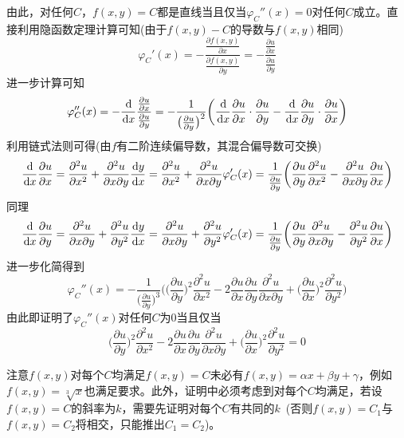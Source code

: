 \documentclass[a4paper,UTF8,fontset=windows,AutoFakeBold]{ctexart}
\newcommand*{\dr}{\hspace{0.07em}\mathrm{d}}
\newcommand*{\note}{\noindent *}
\theoremstyle{ex}
\begin{document}
\begin{enumerate}
    由此，对任何$C$，$f(x,y)=C$都是直线当且仅当$\varphi_C''(x)=0$对任何$C$成立。直接利用隐函数定理计算可知(由于$f(x,y)-C$的导数与$f(x,y)$相同)
    $$\varphi_C'(x)=-\frac{\frac{\partial f(x,y)}{\partial x}}{\frac{\partial f(x,y)}{\partial y}}=-\frac{\frac{\partial u}{\partial x}}{\frac{\partial u}{\partial y}}$$
    进一步计算可知
    $$\varphi_C''(x)=-\frac{\dr}{\dr x}\frac{\frac{\partial u}{\partial x}}{\frac{\partial u}{\partial y}}=-\frac{1}{\big(\frac{\partial u}{\partial y}\big)^2}\bigg(\frac{\dr}{\dr x}\frac{\partial u}{\partial x}\cdot\frac{\partial u}{\partial y}-\frac{\dr}{\dr x}\frac{\partial u}{\partial y}\cdot\frac{\partial u}{\partial x}\bigg)$$
    利用链式法则可得(由$f$有二阶连续偏导数，其混合偏导数可交换)
    $$\frac{\dr}{\dr x}\frac{\partial u}{\partial x}=\frac{\partial^2u}{\partial x^2}+\frac{\partial^2u}{\partial x\partial y}\frac{\dr y}{\dr x}=\frac{\partial^2u}{\partial x^2}+\frac{\partial^2u}{\partial x\partial y}\varphi_C'(x)=\frac{1}{\frac{\partial u}{\partial y}}\bigg(\frac{\partial u}{\partial y}\frac{\partial^2u}{\partial x^2}-\frac{\partial^2u}{\partial x\partial y}\frac{\partial u}{\partial x}\bigg)$$
    同理
    $$\frac{\dr}{\dr x}\frac{\partial u}{\partial y}=\frac{\partial^2u}{\partial x\partial y}+\frac{\partial^2u}{\partial y^2}\frac{\dr y}{\dr x}=\frac{\partial^2u}{\partial x\partial y}+\frac{\partial^2u}{\partial y^2}\varphi_C'(x)=\frac{1}{\frac{\partial u}{\partial y}}\bigg(\frac{\partial u}{\partial y}\frac{\partial^2u}{\partial x\partial y}-\frac{\partial^2u}{\partial y^2}\frac{\partial u}{\partial x}\bigg)$$
    进一步化简得到
    $$\varphi_C''(x)=-\frac{1}{\big(\frac{\partial u}{\partial y}\big)^3}\bigg(\bigg(\frac{\partial u}{\partial y}\bigg)^2\frac{\partial^2u}{\partial x^2}-2\frac{\partial u}{\partial x}\frac{\partial u}{\partial y}\frac{\partial^2u}{\partial x\partial y}+\bigg(\frac{\partial u}{\partial x}\bigg)^2\frac{\partial^2u}{\partial y^2}\bigg)$$
    由此即证明了$\varphi_C''(x)$对任何$C$为0当且仅当
    $$\bigg(\frac{\partial u}{\partial y}\bigg)^2\frac{\partial^2u}{\partial x^2}-2\frac{\partial u}{\partial x}\frac{\partial u}{\partial y}\frac{\partial^2u}{\partial x\partial y}+\bigg(\frac{\partial u}{\partial x}\bigg)^2\frac{\partial^2u}{\partial y^2}=0$$

    \note 注意$f(x,y)$对每个$C$均满足$f(x,y)=C$未必有$f(x,y)=\alpha x+\beta y+\gamma$，例如$f(x,y)=\sqrt[3]{x}$也满足要求。此外，证明中必须考虑到对每个$C$均满足，若设$f(x,y)=C$的斜率为$k$，需要先证明对每个$C$有共同的$k$\ (否则$f(x,y)=C_1$与$f(x,y)=C_2$将相交，只能推出$C_1=C_2$)。
\end{enumerate}
\end{document}
